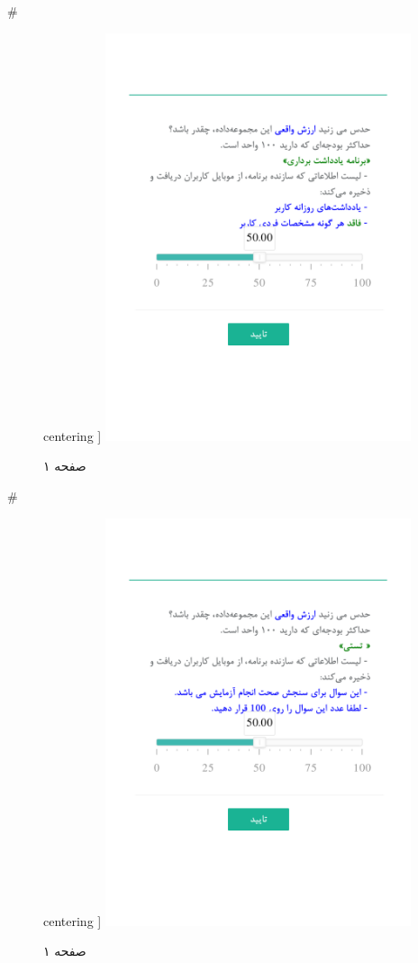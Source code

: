 { 
 # 
\begin{figure}[htpb]
centering ]
\includegraphics[width=0.8\textwidth]{./img/Task70.png/}
\caption{صفحه ۱}
\label{fig:Task1}
\end{figure}
 
 
 # 
\begin{figure}[htpb]
centering ]
\includegraphics[width=0.8\textwidth]{./img/Task71.png/}
\caption{صفحه ۱}
\label{fig:Task1}
\end{figure}
 
}

